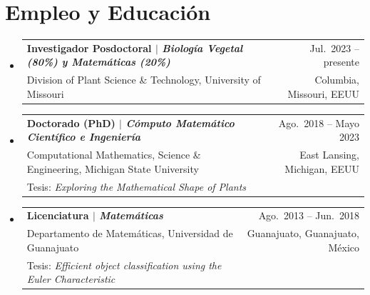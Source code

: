 \documentclass[A4,11pt]{article}
\makeatletter
\newcommand{\CVSubheading}[4]{
	\vspace{-0.5ex}\item
	\begin{tabular*}{0.97\textwidth}[t]{l@{\extracolsep{\fill}}r}
		\textbf{#1} & #2 \\
		\small#3 & \small #4 \\
	\end{tabular*}\vspace{-1.5ex}
}
\newcommand{\CVTubheading}[6]{
	\vspace{-2pt}\item
	\begin{tabular*}{0.97\textwidth}[t]{l@{\extracolsep{\fill}}r}
		\textbf{#1} & #2 \\
		\small#3 & \small #4 \\
		\small#5 & \small #6 \\
	\end{tabular*}\vspace{-7pt}
}
\newcommand{\CVSubHeadingListStart}{\begin{itemize}[leftmargin=0.5cm, label={}]}
\newcommand{\CVSubHeadingListEnd}{\end{itemize}}
\makeatother
\begin{document}
		\section{Empleo y Educaci\'on}
		\CVSubHeadingListStart
		\CVSubheading
		{{Investigador Posdoctoral $|$ \emph{\small{Biolog\'ia Vegetal (80\%) y Matem\'aticas (20\%)}}}}{Jul.~2023 -- presente}
		{Division of Plant Science \& Technology, University of Missouri}{Columbia, Missouri, EEUU}
		\CVTubheading
		{{Doctorado (PhD) $|$ \emph{\small{C\'omputo Matem\'atico Cient\'ifico e Ingenier\'ia}}}}{Ago.~2018 -- Mayo 2023}
		{Computational Mathematics, Science \& Engineering, Michigan State University}{East Lansing, Michigan, EEUU}
		{Tesis: \emph{Exploring the Mathematical Shape of Plants}}{}
		\CVTubheading
		{{Licenciatura $|$ \emph{\small{Matem\'aticas}}}}{Ago.~2013 -- Jun.~2018}
		{Departamento de Matem\'aticas, Universidad de Guanajuato}{Guanajuato, Guanajuato, M\'exico}
		{Tesis: \emph{Efficient object classification using the Euler Characteristic}}{}
		\CVSubHeadingListEnd
		

		
\end{document}
